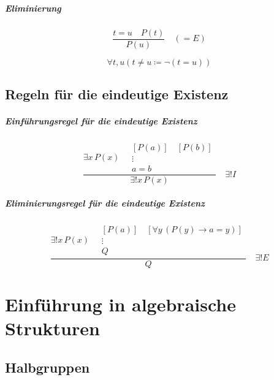 \documentclass{book}
\theoremstyle{plain}
\theoremstyle{remark}
\theoremstyle{definition}
\begin{document}
\paragraph{Eliminierung}
\label{rule:IE}

\[
\frac{t = u \quad P(t)}{P(u)}
\quad (=E)
\]

\label{rule:Neq}
\[\forall t,u(t\neq u\coloneqq \neg(t=u))\]

\section{Regeln für die eindeutige Existenz}
\paragraph{Einführungsregel für die eindeutige Existenz}
\label{rule:UEI}

\[
\frac{
  \exists x\,P(x)
  \quad
  \begin{array}{c}
    [P(a)]\quad [P(b)] \\
    \vdots \\
    a = b 
  \end{array}
}{\exists! x\,P(x)}
\quad \exists! I
\]

\paragraph{Eliminierungsregel  für die eindeutige Existenz}
\label{rule:UEE}


\[
\frac{
  \exists! x\,P(x)
  \quad
  \begin{array}{c}
    [P(a)]\quad [\forall y\,(P(y)\rightarrow a=y)]\\
    \vdots \\
    Q
  \end{array}
}{
  Q
}
\quad \exists! E
\]

\chapter{Einführung in algebraische Strukturen}

\section{Halbgruppen}
\end{document}
